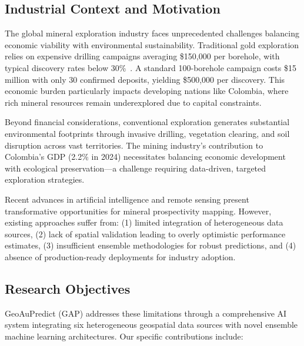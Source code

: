 \documentclass[12pt,a4paper]{article}
\begin{document}
\subsection{Industrial Context and Motivation}

The global mineral exploration industry faces unprecedented challenges balancing economic viability with environmental sustainability. Traditional gold exploration relies on expensive drilling campaigns averaging \$150,000 per borehole, with typical discovery rates below 30\%~\citep{traditional_exploration}. A standard 100-borehole campaign costs \$15 million with only 30 confirmed deposits, yielding \$500,000 per discovery. This economic burden particularly impacts developing nations like Colombia, where rich mineral resources remain underexplored due to capital constraints.

Beyond financial considerations, conventional exploration generates substantial environmental footprints through invasive drilling, vegetation clearing, and soil disruption across vast territories. The mining industry's contribution to Colombia's GDP (2.2\% in 2024) necessitates balancing economic development with ecological preservation—a challenge requiring data-driven, targeted exploration strategies.

Recent advances in artificial intelligence and remote sensing present transformative opportunities for mineral prospectivity mapping. However, existing approaches suffer from: (1) limited integration of heterogeneous data sources, (2) lack of spatial validation leading to overly optimistic performance estimates, (3) insufficient ensemble methodologies for robust predictions, and (4) absence of production-ready deployments for industry adoption.

\subsection{Research Objectives}

GeoAuPredict (GAP) addresses these limitations through a comprehensive AI system integrating six heterogeneous geospatial data sources with novel ensemble machine learning architectures. Our specific contributions include:
\end{document}
